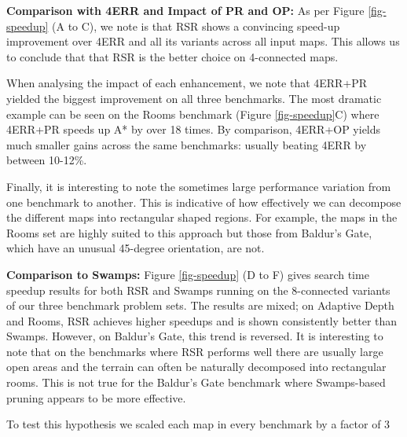 \par
\textbf{Comparison with 4ERR and Impact of PR and OP:}
As per Figure \ref{fig-speedup} (A to C), we note is that RSR shows a convincing 
speed-up improvement over 4ERR and all its variants across all input maps.
This allows us to conclude that that RSR is the better choice on 4-connected maps.
\par
When analysing the impact of each enhancement, we note that 4ERR+PR yielded the
biggest improvement on all three benchmarks.
The most dramatic example can be seen on the Rooms benchmark (Figure \ref{fig-speedup}C) 
where 4ERR+PR speeds up A* by over 18 times.
By comparison, 4ERR+OP yields much smaller gains across the same
benchmarks: usually beating 4ERR by between 10-12\%.
\par
Finally, it is interesting to note the sometimes large performance variation 
from one benchmark to another. This is indicative of how effectively we can 
decompose the different maps into rectangular shaped regions.
For example, the maps in the Rooms set are highly suited to this approach but those
from Baldur's Gate, which have an unusual 45-degree orientation, are not.
\par
\textbf{Comparison to Swamps:}
Figure \ref{fig-speedup} (D to F) gives search time speedup results for both RSR
and Swamps running on the 8-connected variants of our three benchmark problem
sets.  The results are mixed; on Adaptive Depth and Rooms, RSR achieves higher
speedups and is shown consistently better than Swamps. However, on Baldur's
Gate, this trend is reversed.  
It is interesting to note that on the
benchmarks where RSR performs well there are usually large open areas and the
terrain can often be naturally decomposed into rectangular rooms.  This is not
true for the Baldur's Gate benchmark where Swamps-based pruning appears to be
more effective.
\par
To test this hypothesis we scaled each map in every benchmark by a factor of 3
